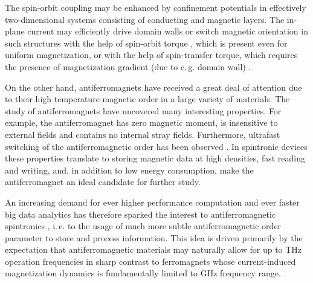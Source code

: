 The spin-orbit coupling may be enhanced by confinement potentials in effectively two-dimensional systems consisting of conducting and magnetic layers. The in-plane current may efficiently drive domain walls or switch magnetic orientation in such structures with the help of spin-orbit torque \cite{awschalom2009trend,manchon_theory_2008,garate_influence_2009,manchon2009theory}, which is present even for uniform magnetization, or with the help of spin-transfer torque, which requires the presence of magnetization gradient (due to e.\,g. domain wall) \cite{slonczewski_current-driven_1996,berger_emission_1996,ralph_spin_2008,stiles_anatomy_2002}. 

On the other hand, antiferromagnets have received a great deal of attention due to their high temperature magnetic order in a large variety of materials. The study of antiferromagnets have uncovered many interesting properties. For example, the antiferromagnet has zero magnetic moment, is
insensitive to external fields and contains no internal stray fields.
Furthermore, ultrafast switching of the antiferromagnetic order has been observed \cite{gomonay_high_2016, olejnik_terahertz_2018, jungwirth_multiple_2018, macdonald_antiferromagnetic_2011,gomonay_spintronics_2014,zelezny_relativistic_2014}. In
spintronic devices these properties translate to storing magnetic data at high densities, fast
reading and writing, and, in addition to low energy consumption, make the antiferromagnet an ideal
candidate for further study.

An increasing demand for ever higher performance computation and ever faster big data analytics has therefore sparked the interest to antiferromagnetic spintronics \cite{macdonald_antiferromagnetic_2011, gomonay_spintronics_2014, wadley_electrical_2016, jungwirth_antiferromagnetic_2016, baltz_antiferromagnetic_2018, jungwirth_multiple_2018, jungfleisch_perspectives_2018}, i.\,e. to the usage of much more subtle antiferromagnetic order parameter to store and process information. This idea is driven primarily by the expectation that antiferromagnetic materials may naturally allow for up to THz operation frequencies \cite{gomonay_high_2016, olejnik_terahertz_2018, jungwirth_multiple_2018, macdonald_antiferromagnetic_2011,gomonay_spintronics_2014,zelezny_relativistic_2014} in sharp contrast to ferromagnets whose current-induced magnetization dynamics is fundamentally limited to GHz frequency range. 
  

